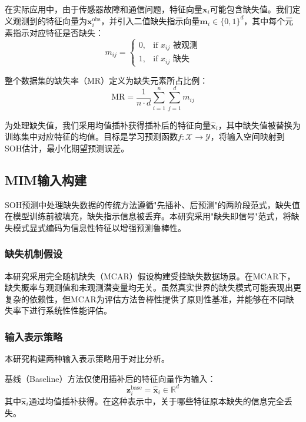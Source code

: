 \documentclass[10pt,a4paper]{ctexart}
\begin{document}
在实际应用中，由于传感器故障和通信问题，特征向量$\mathbf{x}_i$可能包含缺失值。我们定义观测到的特征向量为$\mathbf{x}_i^{\text{obs}}$，并引入二值缺失指示向量$\mathbf{m}_i \in \{0, 1\}^{d}$，其中每个元素指示对应特征是否缺失：
\begin{equation}
    m_{ij} = 
    \begin{cases}
        0, & \text{if } x_{ij} \text{ 被观测} \\
        1, & \text{if } x_{ij} \text{ 缺失}
    \end{cases}
    \label{eq:indicator}
\end{equation}

整个数据集的缺失率（MR）定义为缺失元素所占比例：
\begin{equation}
    \text{MR} = \frac{1}{n \cdot d} \sum_{i=1}^{n} \sum_{j=1}^{d} m_{ij}
    \label{eq:mr}
\end{equation}

为处理缺失值，我们采用均值插补获得插补后的特征向量$\hat{\mathbf{x}}_i$，其中缺失值被替换为训练集中对应特征的均值。目标是学习预测函数$f: \mathcal{X} \rightarrow \mathcal{Y}$，将输入空间映射到SOH估计，最小化期望预测误差。

\subsection{MIM输入构建}\label{sec:mim}

SOH预测中处理缺失数据的传统方法遵循"先插补、后预测"的两阶段范式，缺失值在模型训练前被填充，缺失指示信息被丢弃。本研究采用"缺失即信号"范式，将缺失模式显式编码为信息性特征以增强预测鲁棒性。

\subsubsection{缺失机制假设}

本研究采用完全随机缺失（MCAR）假设构建受控缺失数据场景。在MCAR下，缺失概率与观测值和未观测潜变量均无关。虽然真实世界的缺失模式可能表现出更复杂的依赖性，但MCAR为评估方法鲁棒性提供了原则性基准，并能够在不同缺失率下进行系统性性能评估。

\subsubsection{输入表示策略}

本研究构建两种输入表示策略用于对比分析。

基线（Baseline）方法仅使用插补后的特征向量作为输入：
\begin{equation}
    \mathbf{z}_i^{\text{base}} = \hat{\mathbf{x}}_i \in \mathbb{R}^{d}
\end{equation}
其中$\hat{\mathbf{x}}_i$通过均值插补获得。在这种表示中，关于哪些特征原本缺失的信息完全丢失。
\end{document}
